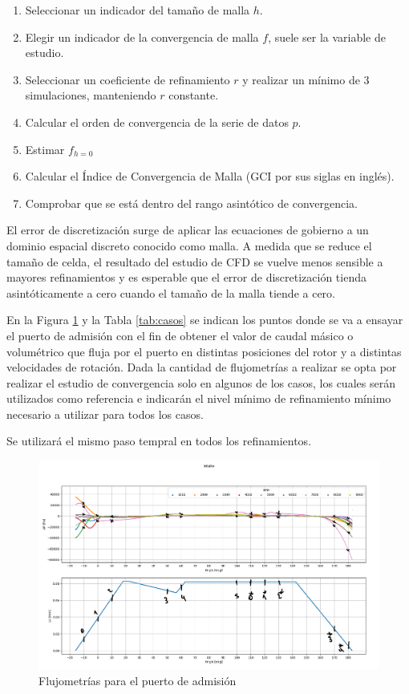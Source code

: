 \documentclass[11pt]{article}
\begin{document}
\begin{enumerate}
    \item Seleccionar un indicador del tamaño de malla $h$.
    \item Elegir un indicador de la convergencia de malla $f$, suele ser la
        variable de estudio.
    \item Seleccionar un coeficiente de refinamiento $r$ y realizar un mínimo
        de 3 simulaciones, manteniendo $r$ constante.
    \item Calcular el orden de convergencia de la serie de datos $p$.
    \item Estimar $f_{h=0}$
    \item Calcular el Índice de Convergencia de Malla (GCI por sus siglas en
        inglés).
    \item Comprobar que se está dentro del rango asintótico de convergencia.
\end{enumerate}

El error de discretización surge de aplicar las ecuaciones de gobierno a un
dominio espacial discreto conocido como malla.
%
A medida que se reduce el tamaño de celda, el resultado del estudio de CFD se
vuelve menos sensible a mayores refinamientos y es esperable que el error de
discretización tienda asintóticamente a cero cuando el tamaño de la malla
tiende a cero.

En la Figura \ref{fig:flujometrias} y la Tabla \ref{tab:casos} se indican los
puntos donde se va a ensayar el puerto de admisión con el fin de obtener el
valor de caudal másico o volumétrico que fluja por el puerto en distintas
posiciones del rotor y a distintas velocidades de rotación.
%
Dada la cantidad de flujometrías a realizar se opta por realizar el estudio de
convergencia solo en algunos de los casos, los cuales serán utilizados como
referencia e indicarán el nivel mínimo de refinamiento mínimo necesario a
utilizar para todos los casos.

Se utilizará el mismo paso tempral en todos los refinamientos.

\begin{figure}
    \includegraphics[width=1\textwidth]{flujometrias_admision.png}
    \caption{Flujometrías para el puerto de admisión}
    \label{fig:flujometrias}
\end{figure}
\end{document}
